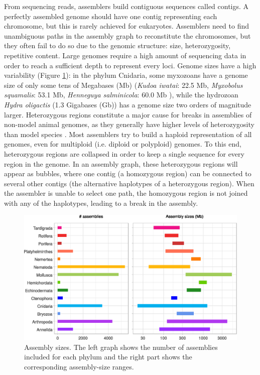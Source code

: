 From sequencing reads, assemblers build contiguous sequences called contigs. A perfectly assembled genome should have one contig representing each chromosome, but this is rarely achieved for eukaryotes. Assemblers need to find unambiguous paths in the assembly graph to reconstitute the chromosomes, but they often fail to do so due to the genomic structure: size, heterozygosity, repetitive content. Large genomes require a high amount of sequencing data in order to reach a sufficient depth to represent every loci. Genome sizes have a high variability (Figure \ref{fig:sizes}): in the phylum Cnidaria, some myxozoans have a genome size of only some tens of Megabases (Mb) (\textit{Kudoa iwatai}: 22.5 Mb, \textit{Myxobolus squamalis}: 53.1 Mb, \textit{Henneguya salminicola}: 60.0 Mb \cite{henneguya_salminicola}), while the hydrozoan \textit{Hydra oligactis} (1.3 Gigabases (Gb)) \cite{hydra_oligactis} has a genome size two orders of magnitude larger. Heterozygous regions constitute a major cause for breaks in assemblies of non-model animal genomes, as they generally have higher levels of heterozygosity than model species \cite{Leffler2012a}. Most assemblers try to build a haploid representation of all genomes, even for multiploid (i.e. diploid or polyploid) genomes. To this end, heterozygous regions are collapsed in order to keep a single sequence for every region in the genome. In an assembly graph, these heterozygous regions will appear  as bubbles, where one contig (a homozygous region) can be connected to several other contigs (the alternative haplotypes of a heterozygous region). When the assembler is unable to select one path, the homozygous region is not joined with any of the haplotypes, leading to a break in the assembly. 

\begin{figure}
    \centering
    \includegraphics[width=\textwidth]{fig/review_assembly_sizes.eps}
    \caption{Assembly sizes. The left graph shows the number of assemblies included for each phylum and the right part shows the corresponding assembly-size ranges.}
    \label{fig:sizes}
\end{figure}

